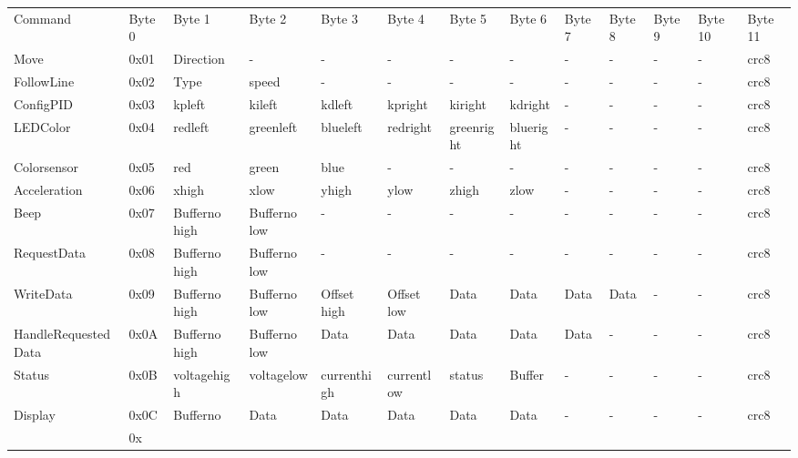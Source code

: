 \documentclass[a4paper]{article}
\begin{document}
\begin{landscape}
\begin{footnotesize}
\begin{tabular}{lllllllllllll}
Command &
    Byte 0 &
    Byte 1 &
    Byte 2 &
    Byte 3 &
    Byte 4 &
    Byte 5 &
    Byte 6 &
    Byte 7 &
    Byte 8 &
    Byte 9 &
    Byte 10 &
    Byte 11 \\
Move &
    0x01 &
    Direction &
    - &
    - &
    - &
    - &
    - &
    - &
    - &
    - &
    - &
    crc8 \\
FollowLine &
    0x02 &
    Type &
    speed &
    - &
    - &
    - &
    - &
    - &
    - &
    - &
    - &
    crc8 \\
ConfigPID &
    0x03 &
    kpleft &
    kileft &
    kdleft &
    kpright &
    kiright &
    kdright &
    - &
    - &
    - &
    - &
    crc8 \\
LEDColor &
    0x04 &
    redleft &
    greenleft &
    blueleft &
    redright &
    greenright &
    blueright &
    - &
    - &
    - &
    - &
    crc8 \\
Colorsensor &
    0x05 &
    red &
    green &
    blue &
    - &
    - &
    - &
    - &
    - &
    - &
    - &
    crc8 \\
Acceleration &
    0x06 &
    xhigh &
    xlow &
    yhigh &
    ylow &
    zhigh &
    zlow &
    - &
    - &
    - &
    - &
    crc8 \\
Beep &
    0x07 &
    Bufferno high &
    Bufferno low &
    - &
    - &
    - &
    - &
    - &
    - &
    - &
    - &
    crc8 \\
RequestData &
    0x08 &
    Bufferno high &
    Bufferno low &
    - &
    - &
    - &
    - &
    - &
    - &
    - &
    - &
    crc8 \\
WriteData &
    0x09 &
    Bufferno high &
    Bufferno low &
    Offset high &
    Offset low &
    Data &
    Data &
    Data &
    Data &
    - &
    - &
    crc8 \\
HandleRequestedData &
    0x0A &
    Bufferno high &
    Bufferno low &
    Data &
    Data &
    Data &
    Data &
    Data &
    - &
    - &
    - &
    crc8 \\
Status &
    0x0B &
    voltagehigh &
    voltagelow &
    currenthigh &
    currentlow &
    status &
    Buffer &
    - &
    - &
    - &
    - &
    crc8 \\
Display &
    0x0C &
    Bufferno &
    Data &
    Data &
    Data &
    Data &
    Data &
    - &
    - &
    - &
    - &
    crc8 \\
 &
    0x &

\end{tabular}
\end{footnotesize}
\end{landscape}
\end{document}
